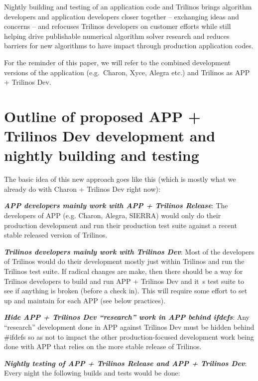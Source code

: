 \documentclass[pdf,ps2pdf,11pt]{SANDreport}
\begin{document}
Nightly building and testing of an application code and Trilinos
brings algorithm developers and application developers closer together --
exchanging ideas and concerns -- and refocuses Trilinos developers on customer 
efforts while still helping drive publishable numerical algorithm solver
research and reduces barriers for new algorithms to have impact through
production application codes.

For the reminder of this paper, we will refer to the combined development
versions of the application (e.g.\ Charon, Xyce, Alegra etc.) and Trilinos as
APP + Trilinos Dev.


%
{}\section{Outline of proposed APP + Trilinos Dev development and nightly
building and testing}
%

The basic idea of this new approach goes like this (which is mostly what we
already do with Charon + Trilinos Dev right now):

{}\textit{\textbf{APP developers mainly work with APP + Trilinos Release}}:
The developers of APP (e.g. Charon, Alegra, SIERRA) would only do their
production development and run their production test suite against a recent
stable released version of Trilinos.

{}\textit{\textbf{Trilinos developers mainly work with Trilinos Dev}}: Most of
the developers of Trilinos would do their development mostly just within
Trilinos and run the Trilinos test suite.  If radical changes are make, then
there should be a way for Trilinos developers to build and run APP + Trilinos
Dev and it~s test suite to see if anything is broken (before a check in).
This will require some effort to set up and maintain for each APP (see below
practices).

{}\textit{\textbf{Hide APP + Trilinos Dev ``research'' work in APP behind
ifdefs}}: Any ``research'' development done in APP against Trilinos Dev must
be hidden behind {}\#ifdefs so as not to impact the other production-focused
development work being done with APP that relies on the more stable release of
Trilinos.

{}\textit{\textbf{Nightly testing of APP + Trilinos Release and APP + Trilinos
Dev}}: Every night the following builds and tests would be done:
\end{document}
